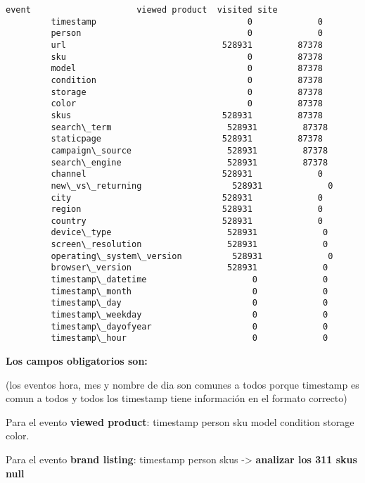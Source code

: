\documentclass[11pt]{article}
\begin{document}
\begin{Verbatim}[commandchars=\\\{\}]
         event                     viewed product  visited site  
         timestamp                              0             0  
         person                                 0             0  
         url                               528931         87378  
         sku                                    0         87378  
         model                                  0         87378  
         condition                              0         87378  
         storage                                0         87378  
         color                                  0         87378  
         skus                              528931         87378  
         search\_term                       528931         87378  
         staticpage                        528931         87378  
         campaign\_source                   528931         87378  
         search\_engine                     528931         87378  
         channel                           528931             0  
         new\_vs\_returning                  528931             0  
         city                              528931             0  
         region                            528931             0  
         country                           528931             0  
         device\_type                       528931             0  
         screen\_resolution                 528931             0  
         operating\_system\_version          528931             0  
         browser\_version                   528931             0  
         timestamp\_datetime                     0             0  
         timestamp\_month                        0             0  
         timestamp\_day                          0             0  
         timestamp\_weekday                      0             0  
         timestamp\_dayofyear                    0             0  
         timestamp\_hour                         0             0  
\end{Verbatim}
            
    \textbf{Los campos obligatorios son: }

(los eventos hora, mes y nombre de dia son comunes a todos porque
timestamp es comun a todos y todos los timestamp tiene información en el
formato correcto)

Para el evento \textbf{viewed product}: timestamp \textbar{} person
\textbar{} sku \textbar{} model \textbar{} condition \textbar{} storage
\textbar{} color.

Para el evento \textbf{brand listing}: timestamp \textbar{} person
\textbar{} skus -\textgreater{} \textbf{analizar los 311 skus null}
\end{document}
